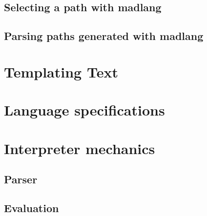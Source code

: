 \documentclass{article}
\theoremstyle{definition}
\theoremstyle{plain}
\begin{document}
\subsection{Selecting a path with madlang}

\subsection{Parsing paths generated with madlang}


\section{Templating Text}

\begin{appendices}
    \section{Language specifications}

    \section{Interpreter mechanics}
    
    \subsection{Parser}

    \subsection{Evaluation}
\end{appendices}

\end{document}
